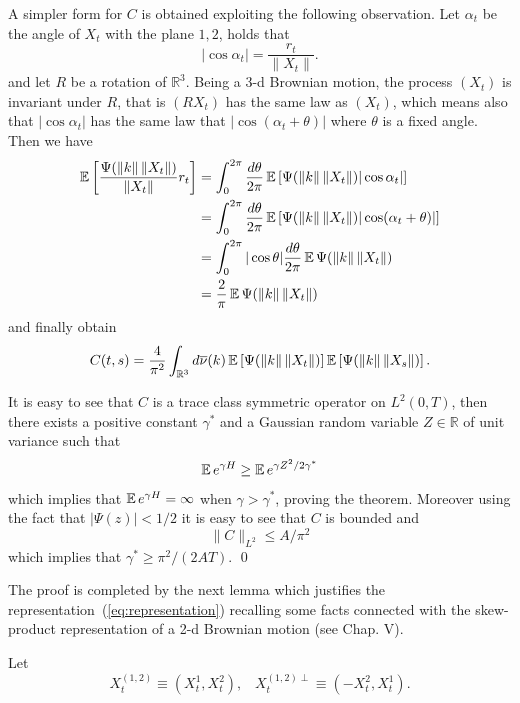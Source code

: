 A simpler form for $C$ is obtained exploiting the following observation. 
Let $\alpha_t$ be the angle of $X_t$ with the plane $1,2$, holds that
$$
|\cos \alpha_t| = \frac{r_t}{\|X_t\|}.
$$ 
and let $R$ be a rotation of $\mathbb{R}^3$. 
Being a 3-d Brownian motion, the process $(X_t)$ is invariant under $R$, that
is $( R X_t )$ has the same law as $( X_t )$, which means also that
$|\cos \alpha_t|$ has the same law that  $|\cos (\alpha_t + \theta)|$ where
$\theta$ is a fixed angle. Then we have
\begin{equation}
\begin{split}
\operatorname{{\mathbb E}} \left[  \frac{\Psi(\|k\|\,\|X_t\|)}{\|X_t\|} r_t
\right] 
& = \int_0^{2\pi} \frac{d\theta}{2\pi} \operatorname{{\mathbb E}} \left[ \Psi(\|k\|\,\|X_t\|) |\cos \alpha_t| \right] \\
& =  \int_0^{2\pi} \frac{d\theta}{2\pi} \operatorname{{\mathbb E}} \left[ \Psi(\|k\|\,\|X_t\|)
  |\cos (\alpha_t + \theta)| \right] \\
& = 
\int_0^{2\pi} |\cos \theta| \frac{d\theta}{2 \pi}  
\operatorname{{\mathbb E}} \Psi(\|k\|\,\|X_t\|)   \\
& =  \frac{2}{\pi} \operatorname{{\mathbb E}} \Psi(\|k\|\,\|X_t\|) \\
\end{split}
\end{equation}
and finally obtain
$$
C(t,s) =  \frac{4 }{\pi^2} \int_{\mathbb{R}^3} d\overline{\nu}(k)
 \operatorname{{\mathbb E}} \left[ \Psi(\|k\|\,\|X_t\|)
 \right] \operatorname{{\mathbb E}} \left[ \Psi(\|k\|\,\|X_s\|) \right].
$$

It is easy to see that $C$ is a trace class symmetric operator on
$L^2(0,T)$, then there exists a positive constant $\gamma^*$ and a
Gaussian random variable $Z \in \mathbb{R}$ of unit variance such that
$$
\operatorname{{\mathbb E}} e^{\gamma H} \ge  \operatorname{{\mathbb E}} e^{\gamma Z^2/2\gamma^*}
$$ 
which implies that 
$\operatorname{{\mathbb E}} e^{\gamma H} =  \infty$ 
when $\gamma > \gamma^*$, proving the theorem. Moreover using the fact that
$|\Psi(z)| < 1/2$ it is easy to see that $C$ is bounded and 
$$
\|C\|_{L^2} \le A /\pi^2
$$
which implies that $\gamma^* \ge \pi^2/(2AT)$. \qed

The proof is completed by the next lemma which justifies the
representation~(\ref{eq:representation}) recalling some facts connected with 
the skew-product representation of a 2-d Brownian motion (see \cite{R-Y} Chap. V).


Let 
\begin{equation*}
X_{t}^{\left( 1,2\right) } \equiv \left( X_{t}^{1},X_{t}^{2}\right)
,\,\,\,\,\,X_{t}^{\left( 1,2\right) \perp } \equiv \left(
-X_{t}^{2},X_{t}^{1}\right) .
\end{equation*}

